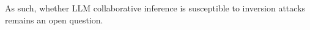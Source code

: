 As such, whether LLM collaborative inference is susceptible to inversion attacks remains an open question.













